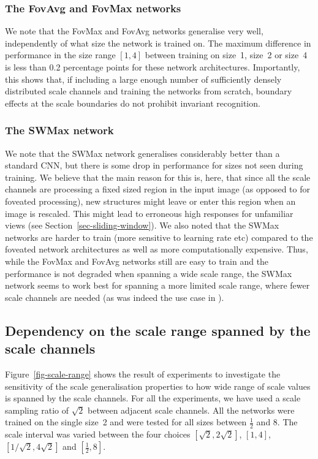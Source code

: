 \documentclass[twocolumn,runningheads]{svjour3}
\begin{document}
\subsubsection{The FovAvg and FovMax networks}

We note that the FovMax and FovAvg networks generalise very well,
independently of what size the network is trained on. The maximum
difference in performance in the size range $[1, 4]$ between training
on size~1, size~2  or size~4  is less than 0.2 percentage points for
these network architectures.
Importantly, this shows that, if including a large enough number of
sufficiently densely distributed scale channels and training the networks from scratch, boundary
effects at the scale boundaries do not prohibit invariant
recognition.

\subsubsection{The SWMax network}

We note that the SWMax network generalises considerably better than a
standard CNN, but there is some drop in performance for sizes not
seen during training. 
We believe that the main reason for this is, here, that since all the
scale channels are processing a fixed sized region in the input image
(as opposed to for foveated processing), new structures might leave or
enter this region when an image is rescaled. This might lead to
erroneous high responses for unfamiliar views
(see Section~\ref{sec-sliding-window}). 
We also noted that the SWMax networks are harder to train (more
sensitive to learning rate etc) compared to the foveated network
architectures as well as more computationally expensive. 
Thus, while the FovMax and Fov\-Avg networks still are easy to train and
the performance is not degraded when spanning a wide scale range, the
SWMax network seems to work best for spanning a more limited scale
range, where fewer scale channels are needed (as was indeed the use
case in \cite{SerEigZhaMatFerLeC13-arXiv}). 

\subsection{Dependency on the scale range spanned by the scale channels}
\label{sec-dep-scale-range}

Figure~\ref{fig-scale-range} shows the result of experiments to
investigate the sensitivity of the scale generalisation properties to
how wide range of scale values is spanned by the scale channels.
For all the experiments, we have used a scale sampling ratio of
$\sqrt{2}$ between adjacent scale channels.
All the networks were trained on the single size~2 and were
tested for all sizes between $\frac{1}{2}$ and 8.
The scale interval was varied between the four choices
$[\sqrt{2}, 2\sqrt{2}]$, $[1, 4]$, $[1/\sqrt{2}, 4\sqrt{2}]$ and
$[\frac{1}{2}, 8]$.
\end{document}
